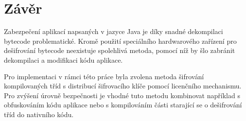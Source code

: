 \section{Závěr}

Zabezpečení aplikací napsaných v jazyce Java je díky snadné dekompilaci bytecode
problematické. Kromě použití speciálního hardwarového zařízení pro dešifrování
bytecode neexistuje spolehlivá metoda, pomocí níž by šlo zabránit dekompilaci a
modifikaci kódu aplikace. %

Pro implementaci v rámci této práce byla zvolena metoda šifrování kompilovaných
tříd s distribucí šifrovacího klíče pomocí licenčního mechanismu. Pro zvýšení
úrovně bezpečnosti je vhodné tuto metodu kombinovat například s obfuskováním
kódu aplikace nebo s kompilováním části starající se o dešifrování tříd do
nativního kódu.
